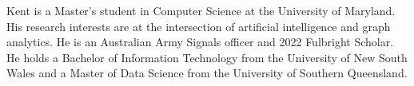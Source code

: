 Kent is a Master's student in Computer Science at the University of Maryland. His research interests are at the intersection of artificial intelligence and graph analytics. He is an Australian Army Signals officer and 2022 Fulbright Scholar. He holds a Bachelor of Information Technology from the University of New South Wales and a Master of Data Science from the University of Southern Queensland. 